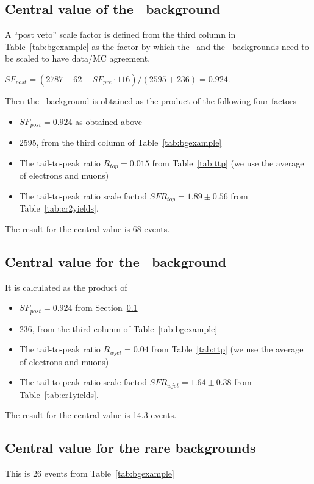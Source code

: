 \subsection{Central value of the \ttsl\ background}
\label{sec:cenvttlj}
A ``post veto'' scale factor is defined from the third column in Table~\ref{tab:bgexample} as the factor by which
the \ttsl\ and the \wjets\ backgrounds need to be scaled to have data/MC agreement.  

\noindent $SF_{post} = (2787 - 62 - SF_{pre} \cdot 116) / (2595 + 236) = 0.924$.

Then the \ttsl\ background is obtained as the product of the following four factors

\begin{itemize}
\item $SF_{post} = 0.924$ as obtained above
\item 2595, from the third column of Table~\ref{tab:bgexample}
\item The tail-to-peak ratio $R_{top} = 0.015$ from Table~\ref{tab:ttp} (we use the average of electrons
and muons)
\item The tail-to-peak ratio scale factod $SFR_{top} = 1.89 \pm 0.56$ from Table~\ref{tab:cr2yields}.
\end{itemize}

The result for the central value is 68 events.

\subsection{Central value for the \wjets\ background}

It is calculated as the product of
\begin{itemize}
\item $SF_{post} = 0.924$ from Section~\ref{sec:cenvttlj}
\item 236, from the third column of Table~\ref{tab:bgexample}
\item The tail-to-peak ratio $R_{wjet} = 0.04$ from Table~\ref{tab:ttp} (we use the average of electrons and muons)
\item The tail-to-peak ratio scale factod $SFR_{wjet} = 1.64 \pm 0.38$ from Table~\ref{tab:cr1yields}.
\end{itemize}

The result for the central value is 14.3 events.

\subsection{Central value for the rare backgrounds}

This is 26 events from Table~\ref{tab:bgexample}

